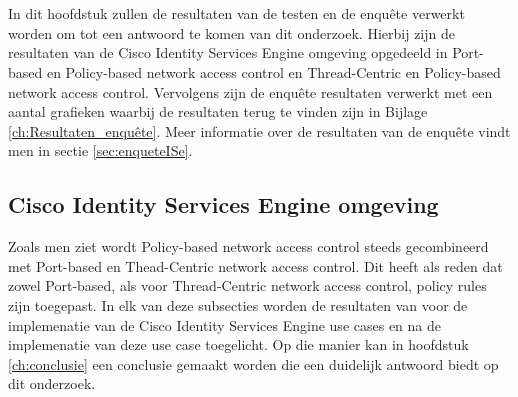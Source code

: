 
 \chapter{}
\label{ch:Resultaten}
In dit hoofdstuk zullen de resultaten van de testen en de enquête verwerkt worden om tot een antwoord te komen van dit onderzoek. Hierbij zijn de resultaten van de Cisco Identity Services Engine omgeving opgedeeld in Port-based en Policy-based network access control en Thread-Centric en Policy-based network access control. Vervolgens zijn de enquête resultaten verwerkt met een aantal grafieken waarbij de resultaten terug te vinden zijn in Bijlage \ref{ch:Resultaten_enquête}. Meer informatie over de resultaten van de enquête vindt men in sectie \ref{sec:enqueteISe}.

\section{Cisco Identity Services Engine omgeving}
Zoals men ziet wordt Policy-based network access control steeds gecombineerd met Port-based en Thead-Centric network access control. Dit heeft als reden dat zowel Port-based, als voor Thread-Centric network access control, policy rules zijn toegepast. In elk van deze subsecties worden de resultaten van voor de implemenatie van de Cisco Identity Services Engine use cases  en na de implemenatie van deze use case toegelicht. Op die manier kan in hoofdstuk \ref{ch:conclusie} een conclusie gemaakt worden die een duidelijk antwoord biedt op dit onderzoek.  
